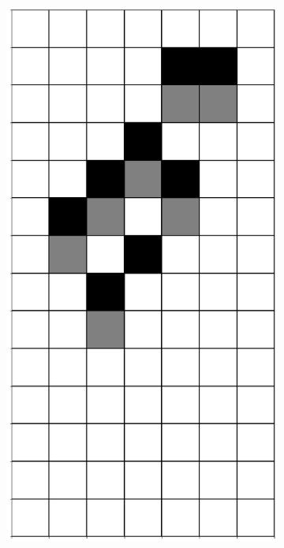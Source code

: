 \documentclass[12pt]{article}
\numberwithin{figure}{section} %
\begin{document}
\begin{figure}[H]
\begin{subfigure}{0.19\textwidth}
     \includegraphics[width=\linewidth]{Section4/16.4}
     \subcaption{}
   \end{subfigure}
      \newline
   \setcounter{subfigure}{0}
   

\end{figure}
\end{document}
